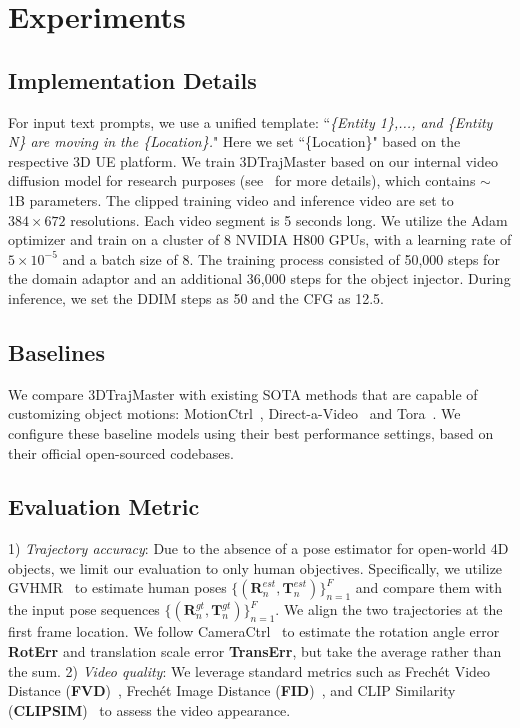 \section{Experiments}
\subsection{Implementation Details}
For input text prompts, we use a unified template: ``\textit{\{Entity 1\},..., and \{Entity N\} are moving in the \{Location\}.}" Here we set ``\{Location\}"  based on the respective 3D UE platform. We train 3DTrajMaster based on our internal video diffusion model for research purposes (see~ for more details), which contains $\sim$ 1B parameters. The clipped training video and inference video are set to $384\times672$ resolutions. Each video segment is 5 seconds long. We utilize the Adam optimizer and train on a cluster of 8 NVIDIA H800 GPUs, with a learning rate of $5 \times 10^{-5}$ and a batch size of 8. The training process consisted of 50,000 steps for the domain adaptor and an additional 36,000 steps for the object injector. During inference, we set the DDIM steps as 50 and the CFG as 12.5. 

\subsection{Baselines}

We compare 3DTrajMaster with existing SOTA methods that are capable of customizing object motions: MotionCtrl~\citep{wang2024motionctrl}, Direct-a-Video~\citep{yang2024direct} and Tora~\citep{zhang2024tora}. We configure these baseline models using their best performance settings, based on their official open-sourced codebases.

\subsection{Evaluation Metric}
1) \textit{Trajectory accuracy}: Due to the absence of a pose estimator for open-world 4D objects, we limit our evaluation to only human objectives. Specifically, we utilize GVHMR~\citep{shen2024gvhmr} to estimate human poses $\{(\mathbf{R}^{est}_n,\mathbf{T}^{est}_n)\}_{n=1}^F$ and compare them with the input pose sequences $\{(\mathbf{R}^{gt}_n,\mathbf{T}^{gt}_n)\}_{n=1}^F$. We align the two trajectories at the first frame location. We follow CameraCtrl~\citep{he2024cameractrl} to estimate the rotation angle error \textbf{RotErr} and translation scale error \textbf{TransErr}, but take the average rather than the sum.
2) \textit{Video quality}: We leverage standard metrics such as Frechét Video Distance (\textbf{FVD})~\citep{unterthiner2018towards}, Frechét Image Distance (\textbf{FID})~\citep{maximilian2020fid}, and CLIP Similarity (\textbf{CLIPSIM})~\citep{wu2021godiva} to assess the video appearance.

